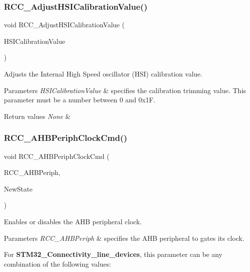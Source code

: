 \subsubsection{\texorpdfstring{RCC\_AdjustHSICalibrationValue()}{RCC\_AdjustHSICalibrationValue()}}
{\footnotesize\ttfamily void R\+C\+C\+\_\+\+Adjust\+H\+S\+I\+Calibration\+Value (\begin{DoxyParamCaption}\item[{uint8\+\_\+t}]{H\+S\+I\+Calibration\+Value }\end{DoxyParamCaption})}



Adjusts the Internal High Speed oscillator (H\+SI) calibration value. 


\begin{DoxyParams}{Parameters}
{\em H\+S\+I\+Calibration\+Value} & specifies the calibration trimming value. This parameter must be a number between 0 and 0x1F. \\
\hline
\end{DoxyParams}

\begin{DoxyRetVals}{Return values}
{\em None} & \\
\hline
\end{DoxyRetVals}
\mbox{\label{group___r_c_c___private___functions_gae0b30d8598b8393bdba9c3fefba3a968}} 
\subsubsection{\texorpdfstring{RCC\_AHBPeriphClockCmd()}{RCC\_AHBPeriphClockCmd()}}
{\footnotesize\ttfamily void R\+C\+C\+\_\+\+A\+H\+B\+Periph\+Clock\+Cmd (\begin{DoxyParamCaption}\item[{uint32\+\_\+t}]{R\+C\+C\+\_\+\+A\+H\+B\+Periph,  }\item[{\mbox{\hyperlink{group___exported__types_gac9a7e9a35d2513ec15c3b537aaa4fba1}{Functional\+State}}}]{New\+State }\end{DoxyParamCaption})}



Enables or disables the A\+HB peripheral clock. 


\begin{DoxyParams}{Parameters}
{\em R\+C\+C\+\_\+\+A\+H\+B\+Periph} & specifies the A\+HB peripheral to gates its clock.\\
\hline
\end{DoxyParams}
For {\bfseries{S\+T\+M32\+\_\+\+Connectivity\+\_\+line\+\_\+devices}}, this parameter can be any combination of the following values\+:

